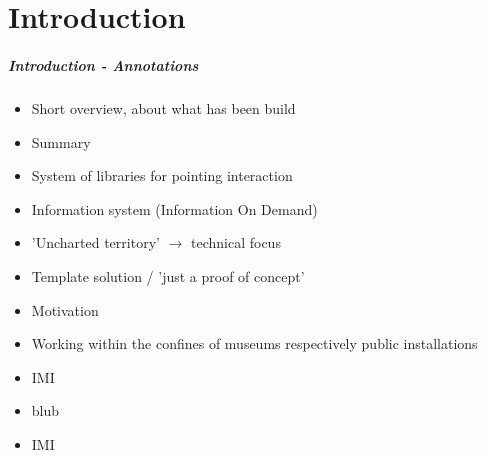 \chapter{Introduction}
\label{introduction}

%
%

\paragraph{Introduction - Annotations}

\begin{itemize}
	\item Short overview, about what has been build
	\item Summary
	\\
	\item System of libraries for pointing interaction
	\item Information system (Information On Demand)
	\item 'Uncharted territory' $\to$ technical focus
	\item Template solution / 'just a proof of concept'
  \\
	\item Motivation
	\item Working within the confines of museums respectively public installations
	\\
	\item \ac{IMI}
	\item blub
	\item \ac{IMI}
\end{itemize}

